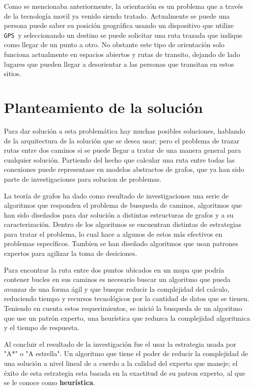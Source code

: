 \documentclass[journal]{IEEEtran}
\newcommand{\gp}{\texttt{GPS~}}
\begin{document}
Como se mencionaba anteriormente, la orientación es un problema que a través de la tecnología movil ya venido siendo tratado.
Actualmente se puede una persona puede saber su posición
geográfica usando un dispositivo que utilize \gp y seleccionando un destino se puede solicitar una ruta trazada que indique como
llegar de un punto a otro. No obstante este tipo de
orientación solo funciona actualmente en espacios abiertos y rutas de transito, dejando de lado lugares que pueden llegar a
desorientar a las personas que transitan en estos sitios.

\section{Planteamiento de la solución}
Para dar solución a esta problemática hay muchas posibles soluciones, hablando de la arquitectura de la solución que se desea usar;
pero el problema de trazar rutas entre dos caminos si se puede llegar a tratar de una manera general para cualquier solución. Partiendo del hecho que calcular una ruta entre todas las conexiones puede representase en modelos abstractos de grafos, que ya han sido parte de investigaciones para solucion de problemas.

La teoría de grafos ha dado como resultado de investigaciones una serie de algoritmos que responden el problema de busqueda de caminos, algoritmos que han sido diseñados para dar solución a distintas estructuras de grafos y a su caracterización. Dentro de los algoritmos se encuentran distintas de estrategias para tratar el problema, lo cual hace a algunos de estos más efectivos en problemas específicos. Tambíen se han diseñado algoritmos que usan patrones expertos para agilizar la toma de desiciones.

Para encontrar la ruta entre dos puntos ubicados en un mapa que podría contener bucles en sus caminos es necesario buscar un algoritmo que pueda avanzar de una forma ágil y que busque reducir la complejidad del calculo, reduciendo tiempo y recursos tecnológicos por la cantidad de datos que se tienen. Teniendo en cuenta estos requerimientos, se inició la busqueda de un algoritmo que use un patrón experto, una heurística que reduzca la complejidad algoritmica y el tiempo de respuesta.

Al concluir el resultado de la investigación fue el usar la estrategia usada por "A*" o "A estrella". Un algoritmo que tiene el poder de reducir la complejidad de una solución a nivel lineal de a cuerdo a la calidad del experto que maneje; el éxito de esta estrategia esta basada en la exactitud de su patron experto, al que se le conoce como \textbf{heurística}. 
\end{document}
